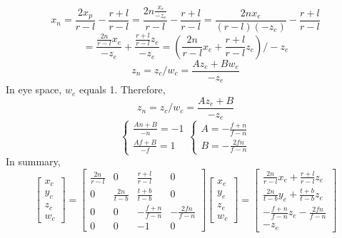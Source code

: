 \documentclass{article}
\begin{document}
\[x_{n}=\frac{2x_{p}}{r-l} - \frac{r+l}{r-l}
= \frac{2n\frac{x_{e}}{-z_{e}}}{r-l} - \frac{r+l}{r-l}
= \frac{2nx_{e}}{(r-l)(-z_{e})} - \frac{r+l}{r-l}\]
\[=\frac{\frac{2n}{r-l}x_{e}}{-z_{e}}+\frac{\frac{r+l}{r-l}z_{e}}{-z_{e}}
=(\frac{2n}{r-l}x_{e}+\frac{r+l}{r-l}z_{e})/-z_{e}\]
\[z_{n}=z_{c}/w_{c}=\frac{Az_{e}+Bw_{e}}{-z_{e}}\]
In eye space, \(w_{e}\) equals 1. Therefore,
\[z_{n}=z_{c}/w_{c}=\frac{Az_{e}+B}{-z_{e}}\]
\begin{equation}
    \begin{cases}
        \frac{An+B}{-n} = -1 \\
        \frac{Af+B}{-f} = 1
    \end{cases}
    \begin{cases}
        A = -\frac{f+n}{f-n} \\
        B = -\frac{2fn}{f-n}
    \end{cases}
\end{equation}
In summary,
\[\begin{bmatrix}
    x_{c} \\ y_{c} \\ z_{c} \\ w_{c}
\end{bmatrix}=\begin{bmatrix}
   \frac{2n}{r-l} &0 &\frac{r+l}{r-l} &0 \\
   0 &\frac{2n}{t-b} &\frac{t+b}{t-b} &0 \\
   0 &0 &-\frac{f+n}{f-n} &-\frac{2fn}{f-n} \\
   0 &0 &-1 &0
\end{bmatrix}\begin{bmatrix}
    x_{e} \\ y_{e} \\ z_{e} \\ w_{e}
\end{bmatrix}=\begin{bmatrix}
    \frac{2n}{r-l}x_{e}+\frac{r+l}{r-l}z_{e} \\
    \frac{2n}{t-b}y_{e}+\frac{t+b}{t-b}z_{e} \\
    -\frac{f+n}{f-n}z_{e}-\frac{2fn}{f-n} \\
    -z_{e}
\end{bmatrix}\]
\end{document}

